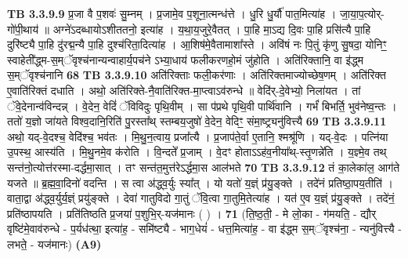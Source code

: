 \documentclass[17pt]{extarticle}
\begin{document}
{{{{{{{{{{{{{{{{{{{                  \newline
                                \textbf{ TB 3.3.9.9} \newline
                  प्र॒जा वै प॒शवः॑ सु॒म्नम् । प्र॒जामे॒व प॒शूना॒त्मन्ध॑त्ते । धु॒रि धु॒र्यौ॑ पात॒मित्या॑ह । जा॒या॒प॒त्योर्-गो॑पी॒थाय॑ ॥ अग्ने॑ऽदब्धायोऽशीततनो॒ इत्या॑ह । य॒था॒य॒जुरे॒वैतत् । पा॒हि मा॒ऽद्य दि॒वः पा॒हि प्रसि॑त्यै पा॒हि दुरि॑ष्ट्यै पा॒हि दु॑रद्म॒न्यै पा॒हि दुश्च॑रिता॒दित्या॑ह । आ॒शिष॑मे॒वैतामाशा᳚स्ते । अवि॑षं नः पि॒तुं कृ॑णु सु॒षदा॒ योनिꣳ॒॒ स्वाहेती᳚द्ध्म-स॒म्ॅवृश्च॑नान्यन्वाहार्य॒पच॑ने ऽभ्या॒धाय॑ फलीकरणहो॒मं जु॑होति । अति॑रिक्तानि॒ वा इ॑द्ध्म स॒म्ॅवृश्च॑नानि \textbf{ 68} \newline
                  \newline
                                \textbf{ TB 3.3.9.10} \newline
                  अति॑रिक्ताः फली॒कर॑णाः । अति॑रिक्तमाज्योच्छेष॒णम् । अति॑रिक्त ए॒वाति॑रिक्तं दधाति । अथो॒ अति॑रिक्ते-नै॒वाति॑रिक्त-मा॒प्त्वाऽव॑रुन्धे ॥ वेदि॑र्-दे॒वेभ्यो॒ निला॑यत । तां ॅवे॒देनान्व॑विन्दन्न् । वे॒देन॒ वेदिं॑ ॅविविदुः पृथि॒वीम् । सा प॑प्रथे पृथि॒वी पार्थि॑वानि । गर्भं॑ बिभर्ति॒ भुव॑नेष्व॒न्तः । ततो॑ य॒ज्ञो जा॑यते विश्व॒दानि॒रिति॑ पु॒रस्ता᳚थ् स्तम्बय॒जुषो॑ वे॒देन॒ वेदिꣳ॒॒ संमा॒ष्ट्र्यनु॑वित्त्यै \textbf{ 69} \newline
                  \newline
                                \textbf{ TB 3.3.9.11} \newline
                  अथो॒ यद्-वे॒दश्च॒ वेदि॑श्च॒ भव॑तः । मि॒थु॒न॒त्वाय॒ प्रजा᳚त्यै । प्र॒जाप॑ते॒र्वा ए॒तानि॒ श्मश्रू॑णि । यद्-वे॒दः । पत्नि॑या उ॒पस्थ॒ आस्य॑ति । मि॒थु॒नमे॒व क॑रोति । वि॒न्दते᳚ प्र॒जाम् । वे॒दꣳ होताऽऽह॑व॒नीया᳚थ्-स्तृ॒णन्ने॑ति । य॒ज्ञ्मे॒व तथ् सन्त॑नो॒त्योत्त॑रस्मा-दर्द्धमा॒सात् । तꣳ सन्त॑त॒मुत्त॑रेऽर्द्धमा॒स आल॑भते \textbf{ 70} \newline
                  \newline
                                \textbf{ TB 3.3.9.12} \newline
                  तं का॒लेका॑ल॒ आग॑ते यजते ॥ ब्र॒ह्म॒वा॒दिनो॑ वदन्ति । स त्वा अ॑द्ध्व॒र्युः स्या᳚त् । यो यतो॑ य॒ज्ञ्ं प्र॑यु॒ङ्क्ते । तदे॑नं प्रतिष्ठा॒पय॒तीति॑ । वाता॒द्वा अ॑द्ध्व॒र्युर्य॒ज्ञ्ं प्रयु॑ङ्क्ते । देवा॑ गातुविदो गा॒तुं ॅवि॒त्वा गा॒तुमि॒तेत्या॑ह । यत॑ ए॒व य॒ज्ञ्ं प्र॑यु॒ङ्क्ते । तदे॑नं॒ प्रति॑ष्ठापयति । प्रति॑तिष्ठति प्र॒जया॑ प॒शुभि॒र्-यज॑मानः ( ) । \textbf{ 71} \newline
                  \newline
                                    (ति॒ष्ठ॒ती॒ - मे लो॒का - ग॑मयति॒ - द्यौर् वृष्टि॑मे॒वाव॑रुन्धे - प॒र्यध॑त्था॒ इत्या॑ह॒ - समि॑ष्ट्यै - भाग॒धेयं॑ - धत्त॒मित्या॑ह॒ - वा इ॑द्ध्म स॒म्ॅवृश्च॑ना॒ - न्यनु॑वित्त्यै - लभते॒ - यज॑मानः) \textbf{(A9)} \newline \newline
}}}}}}}}}}}}}}}}}}}
\end{document}
